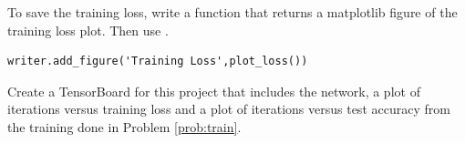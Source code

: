 To save the training loss, write a function that returns a matplotlib figure of the training loss plot.
Then use .

\begin{lstlisting}
writer.add_figure('Training Loss',plot_loss())
\end{lstlisting}

\begin{problem}

Create a TensorBoard for this project that includes the network, a plot of iterations versus training loss and a plot of iterations versus test accuracy from the training done in Problem \ref{prob:train}.

\end{problem}

